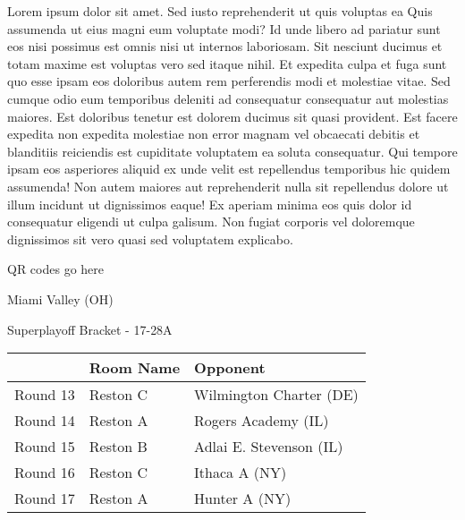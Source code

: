 \documentclass{article}%
\begin{document}
\vspace*{8pt}%
\linebreak%
\newline%
\newline%
Lorem ipsum dolor sit amet. Sed iusto reprehenderit ut quis voluptas ea Quis assumenda ut eius magni eum voluptate modi? Id unde libero ad pariatur sunt eos nisi possimus est omnis nisi ut internos laboriosam. Sit nesciunt ducimus et totam maxime est voluptas vero sed itaque nihil. Et expedita culpa et fuga sunt quo esse ipsam eos doloribus autem rem perferendis modi et molestiae vitae.\newline%
\newline%
Sed cumque odio eum temporibus deleniti ad consequatur consequatur aut molestias maiores. Est doloribus tenetur est dolorem ducimus sit quasi provident. Est facere expedita non expedita molestiae non error magnam vel obcaecati debitis et blanditiis reiciendis est cupiditate voluptatem ea soluta consequatur. Qui tempore ipsam eos asperiores aliquid ex unde velit est repellendus temporibus hic quidem assumenda!\newline%
\newline%
Non autem maiores aut reprehenderit nulla sit repellendus dolore ut illum incidunt ut dignissimos eaque! Ex aperiam minima eos quis dolor id consequatur eligendi ut culpa galisum. Non fugiat corporis vel doloremque dignissimos sit vero quasi sed voluptatem explicabo.\newline%
\newline%
%
\vspace*{30pt}%
\begin{center}%
\begin{Huge}%
QR codes go here%
\end{Huge}%
\end{center}%
\newpage%
\begin{center}%
\begin{Huge}%
Miami Valley (OH)%
\end{Huge}%
\vspace*{8pt}%
\linebreak%
\begin{Large}%
Superplayoff Bracket {-} 17{-}28A%
\end{Large}%
\end{center}%
%
\begin{tabularx}{\textwidth}{|c|Y|Y|}%
\hline%
&Room Name&Opponent\\%
\hline%
Round 13&Reston C&Wilmington Charter (DE)\\%
Round 14&Reston A&Rogers Academy (IL)\\%
Round 15&Reston B&Adlai E. Stevenson (IL)\\%
Round 16&Reston C&Ithaca A (NY)\\%
Round 17&Reston A&Hunter A (NY)\\%
\hline%
\end{tabularx}%
\end{document}
